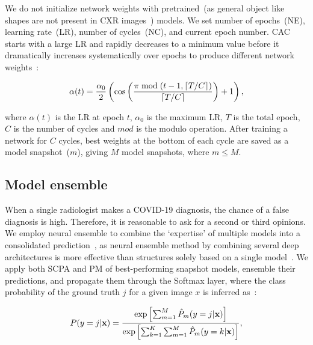 \documentclass[conference]{IEEEtran}
\begin{document}
\fi
We do not initialize network weights with pretrained~(as general object like shapes are not present in CXR images~\cite{karimdeepcovidexplainer}) models. We set number of epochs~(NE), learning rate~(LR), number of cycles~(NC), and current epoch number. CAC starts with a large LR and rapidly decreases to a minimum value before it dramatically increases systematically over epochs to produce different network weights~\cite{huang2017snapshot}: 

\vspace{-2mm}
\begin{equation}
    \label{eq:lr-cosine}
    \scriptsize{
    \alpha(t)=\frac{\alpha_{0}}{2}\left(\cos \left(\frac{\pi \bmod (t-1,\lceil T / C\rceil)}{\lceil T / C\rceil}\right)+1\right),}
\end{equation}

where $\alpha(t)$ is the LR at epoch $t$, $\alpha_0$ is the maximum LR, $T$ is the total epoch, $C$ is the number of cycles and $mod$ is the modulo operation. After training a network for $C$ cycles, best weights at the bottom of each cycle are saved as a model snapshot~($m$), giving $M$ model snapshots, where $m \leq M$. 

\subsection{Model ensemble}
When a single radiologist makes a COVID-19 diagnosis, the chance of a false diagnosis is high. Therefore, it is reasonable to ask for a second or third opinions. %
We employ neural ensemble to combine the `expertise' of multiple models into a consolidated prediction~\cite{huang2017snapshot}, as neural ensemble method by combining several deep architectures is more effective than structures solely based on a single model~\cite{huang2017snapshot,karim2019snapshot}. 
We apply both SCPA and PM of best-performing snapshot models, ensemble their predictions, and propagate them through the Softmax layer, where the class probability of the ground truth $j$ for a given image $x$ is inferred as~\cite{7}:

\vspace{-2mm}
\begin{equation}
\scriptsize{
    P(y=j | \mathbf{x})=\frac{\exp \left[\sum_{m=1}^{M} \hat{P}_{m}(y=j | \mathbf{x})\right]}{\exp \left[\sum_{k=1}^{K} \sum_{m=1}^{M} \hat{P}_{m}(y=k | \mathbf{x})\right]},}
\end{equation}
\end{document}
